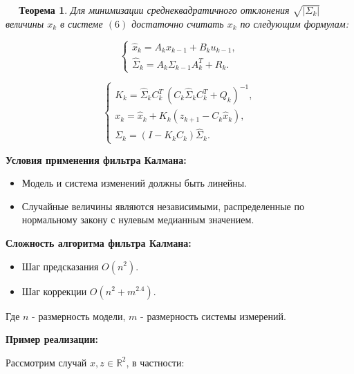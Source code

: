 \documentclass[12pt, a4paper]{article}
\newtheorem{theorem}{$\quad$ Теорема}
\begin{document}
\begin{theorem}
Для минимизации среднеквадратичного отклонения $\sqrt{\vert \Sigma_{k} \vert}$ величины $x_{k}$ в системе $(6)$ достаточно считать $x_k$ по следующим формулам:

\begin{equation}
\begin{cases}
\widehat{x}_{k} = A_{k}x_{k-1} + B_{k}u_{k-1}, \\
\widehat{\Sigma}_k = A_k\Sigma_{k-1}A_k^T + R_k.
\end{cases}
\end{equation}

\begin{equation}
\begin{cases}
K_k = \widehat{\Sigma}_k C_k^T \:(C_k \widehat{\Sigma}_k C_k^T + Q_k)^{-1}, \\
x_k = \widehat{x}_{k} + K_k(z_{k+1} - C_k \widehat{x}_{k}), \\
\Sigma_k = (I - K_k C_k)\widehat{\Sigma}_k.
\end{cases}
\end{equation}

\end{theorem}
\textbf{Условия применения фильтра Калмана:}
\begin{itemize}
\item Модель и система изменений должны быть линейны. \\

\begin{figure}[htbp]
\label{ris:foto2.jpg}
\end{figure}

\item Случайные величины являются независимыми, распределенные по нормальному закону с нулевым медианным значением.
\end{itemize}
\textbf{Сложность алгоритма фильтра Калмана:}

\begin{itemize}
\item Шаг предсказания $O(n^2)$.
\item Шаг коррекции $O(n^2 + m^{2.4})$.
\end{itemize}
Где $n$ - размерность модели, $m$ - размерность системы измерений.

\begin{flushleft}
\textbf{Пример реализации:}
\end{flushleft}

Рассмотрим случай $x, z \in \mathds{R}^2$, в частности:
\end{document}
